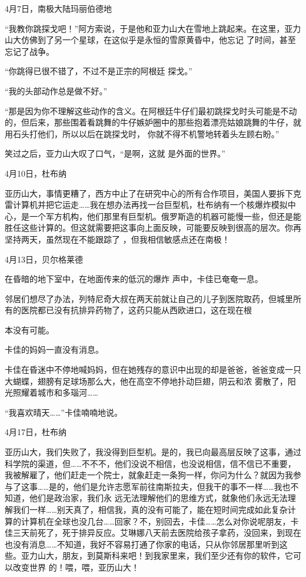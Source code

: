 \documentclass{article}
\begin{document}
4月7日，南极大陆玛丽伯德地 

“我教你跳探戈吧！”阿方索说，于是他和亚力山大在雪地上跳起来。在这里，亚力山大仿佛到了另一个星球，在这似乎是永恒的雪原黄昏中，他忘记
了时间，甚至忘记了战争。 

“你跳得已很不错了，不过不是正宗的阿根廷
探戈。” 


“我的头部动作总是做不好。” 

“那是因为你不理解这些动作的含义。在阿根廷牛仔们最初跳探戈时头可能是不动的，但后来，那些围着看跳舞的牛仔嫉妒圈中的那些抱着漂亮姑娘跳舞的牛仔，就用石头打他们，所以以后在跳探戈时，
你就不得不机警地转着头左顾右盼。” 

笑过之后，亚力山大叹了口气，“是啊，这就
是外面的世界。” 

\newpage



4月10日，杜布纳 

亚历山大，事情更糟了，西方中止了在研究中心的所有合作项目，美国人要拆下克雷计算机并把它运走……我在想办法再找一台巨型机，杜布纳有一个核爆炸模拟中心，是一个军方机构，他们那里有巨型机。俄罗斯造的机器可能慢一些，但还是能胜任这些计算的。但这就需要把这事向上面反映，可能要反映到很高的层次。你再坚持两天，虽然现在不能跟踪了
，但我相信敏感点还在南极！ 



4月13日，贝尔格莱德 

在昏暗的地下室中，在地面传来的低沉的爆炸
声中，卡佳已奄奄一息。 

邻居们想尽了办法，列特尼奇大叔在两天前就让自己的儿子到医院取药，但城里所有的医院都已没有抗排异药物了，这药只能从西欧进口，这在现在根
\newpage

本没有可能。 


卡佳的妈妈一直没有消息。 

卡佳在昏迷中不停地喊妈妈，但在她残存的意识中出现的却是爸爸，爸爸变成一只大蝴蝶，翅膀有足球场那么大，他在高空不停地扑动巨翅，阴云和浓
雾散了，阳光照耀着城市和多瑙河…… 


“我喜欢晴天……”卡佳喃喃地说。 



4月17日，杜布纳 

亚历山大，我们失败了，我没得到巨型机。是的，我已向最高层反映了这事，通过科学院的渠道，但……不不不，他们没说不相信，也没说相信，信不信已不重要，我被解雇了，他们赶走一个院士，就象赶走一条狗一样，你问为什么？就因为我参与了这事……是的，他们是允许志愿军前往南斯拉夫，但我干的事不一样……我也不知道，他们是政治家，我们永
\newpage
远无法理解他们的思维方式，就象他们永远无法理解我们一样……别天真了，相信我，真的没有可能了，能在短时间完成如此复杂计算的计算机在全球也没几台……回家？不，别回去，卡佳……怎么对你说呢朋友，卡佳三天前死了，死于排异反应。艾琳娜八天前去医院给孩子拿药，没回来，到现在也没有消息……不知道，我好不容易打通了你家的电话，只从你邻居那里听到这些。亚力山大，朋友，到莫斯科来吧！到我家里来，我们至少还有你的软件，它可以改变世界
的！喂，喂，亚历山大！ 
\end{document}

